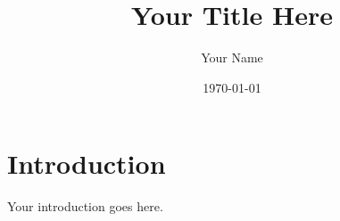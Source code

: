 \documentclass[12pt, a4paper]{article}
\title{Your Title Here}
\author{Your Name}
\date{\today}
\begin{document}
\maketitle

\section{Introduction}

Your introduction goes here.
\end{document}
